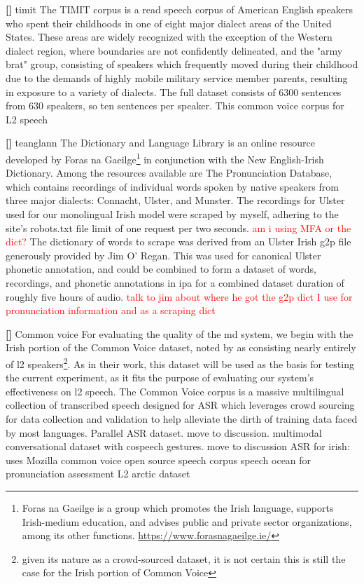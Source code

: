 \documentclass[thesis]{cluu}
\newcounter{paranum}
\newcommand{\numberedparagraph}{\par\refstepcounter{paranum}\textbf{[\theparanum] }}
\newcommand{\todo}[1]{\textcolor{red}{#1}}
\begin{document}
\numberedparagraph timit
The TIMIT corpus is a read speech corpus of American English speakers who spent their childhoods in one of eight major dialect areas of the United States. These areas are widely recognized with the exception of the Western dialect region, where boundaries are not confidently delineated, and the "army brat" group, consisting of speakers which frequently moved during their childhood due to the demands of highly mobile military service member parents, resulting in exposure to a variety of dialects. The full dataset consists of 6300 sentences from 630 speakers, so ten sentences per speaker. This 
\textcite{ardilaCommonVoiceMassivelyMultilingual2020} common voice corpus for L2 speech

\numberedparagraph teanglann
The Dictionary and Language Library is an online resource developed by Foras na Gaeilge\footnote{Foras na Gaeilge is a group which promotes the Irish language, supports Irish-medium education, and advises public and private sector organizations, among its other functions. \url{https://www.forasnagaeilge.ie/}} in conjunction with the New English-Irish Dictionary. Among the resources available are The Pronunciation Database, which contains recordings of individual words spoken by native speakers from three major dialects: Connacht, Ulster, and Munster. The recordings for Ulster used for our monolingual Irish model were scraped by myself, adhering to the site's robots.txt file limit of one request per two seconds. \todo{am i using MFA or the dict?} The dictionary of words to scrape was derived from an Ulster Irish \gls{g2p} file generously provided by Jim O' Regan. This was used for canonical Ulster phonetic annotation, and could be combined to form a dataset of words, recordings, and phonetic annotations in \gls{ipa} for a combined dataset duration of roughly five hours of audio.
\todo{talk to jim about where he got the g2p dict I use for pronunciation information and as a scraping dict}

\numberedparagraph Common voice
For evaluating the quality of the \gls{md} system, we begin with the Irish portion of the Common Voice dataset\textcite{ardila2019common}, noted by \textcite{lonerganAutomaticSpeechRecognition} as consisting nearly entirely of \gls{l2} speakers\footnote{given its nature as a crowd-sourced dataset, it is not certain this is still the case for the Irish portion of Common Voice}. As in their work, this dataset will be used as the basis for testing the current experiment, as it fits the purpose of evaluating our system's effectiveness on \gls{l2} speech. The Common Voice corpus is a massive multilingual collection of transcribed speech designed for ASR which leverages crowd sourcing for data collection and validation to help alleviate the dirth of training data faced by most languages. 
\textcite{conneauFLEURSFewshotLearning2022} Parallel ASR dataset. move to discussion.
\textcite{deichlerMMConvMultimodalConversational2024} multimodal conversational dataset with cospeech gestures. move to discussion
\textcite{qianAutomaticSpeechRecognition2022} ASR for irish: uses Mozilla common voice
\textcite{zhangSpeechocean762OpenSourceNonnative2021} open source speech corpus speech ocean for pronunciation assessment
\textcite{zhaoL2ARCTICNonnativeEnglish2018} L2 arctic dataset
\end{document}
